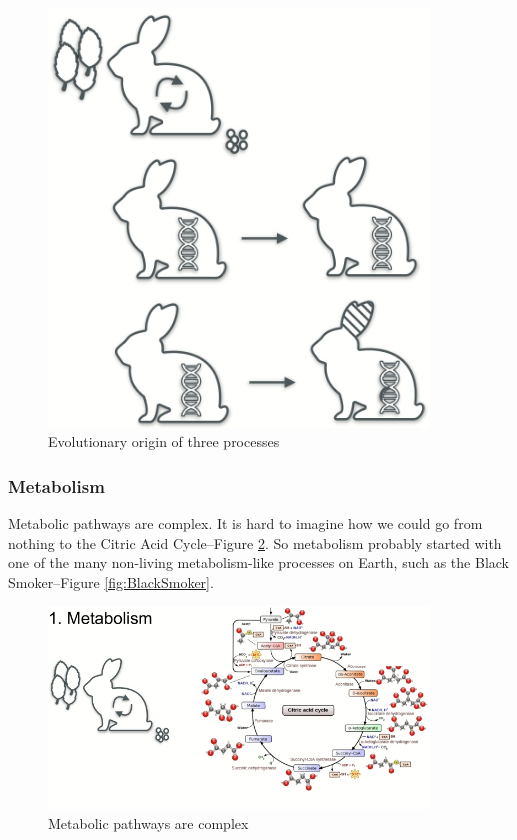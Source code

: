 \documentclass[]{article}
\begin{document}
\begin{figure}[H]
	\caption{Evolutionary origin of three processes}\label{fig:EvolutionaryOrigin}
	\includegraphics[width=0.9\textwidth]{EvolutionaryOrigin}
\end{figure}

\subsubsection{Metabolism}

Metabolic pathways are complex. It is hard to imagine how we could go from nothing to the Citric Acid Cycle--Figure \ref{fig:CitricAcidCycle}. So metabolism probably started with one of the many non-living metabolism-like processes on Earth, such as the Black Smoker--Figure \ref{fig:BlackSmoker}.
\begin{figure}[H]
	\caption{Metabolic pathways are complex}\label{fig:CitricAcidCycle}
	\includegraphics[width=0.9\textwidth]{CitricAcidCycle}
\end{figure}
\end{document}
